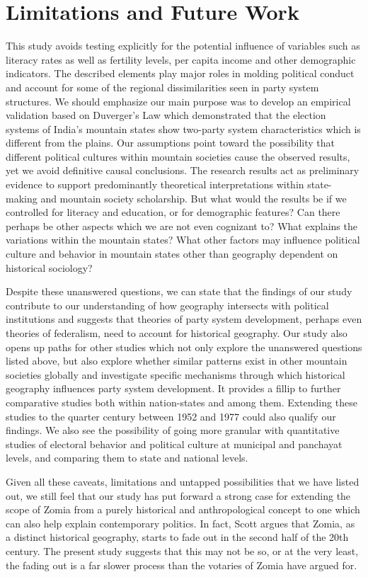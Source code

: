 \section{Limitations and Future Work}
This study avoids testing explicitly for the potential influence of variables such as literacy rates as well as fertility levels, per capita income and other demographic indicators. The described elements play major roles in molding political conduct and account for some of the regional dissimilarities seen in party system structures. We should emphasize our main purpose was to develop an empirical validation based on Duverger's Law which demonstrated that the election systems of India's mountain states show two-party system characteristics which is different from the plains. Our assumptions point toward the possibility that different political cultures within mountain societies cause the observed results, yet we avoid definitive causal conclusions. The research results act as preliminary evidence to support predominantly theoretical interpretations within state-making and mountain society scholarship. But what would the results be if we controlled for literacy and education, or for demographic features? Can there perhaps be other aspects which we are not even cognizant to?  What explains the variations within the mountain states? What other factors may influence political culture and behavior in mountain states other than geography dependent on historical sociology?  

Despite these unanswered questions, we can state that the findings of our study contribute to our understanding of how geography intersects with political institutions and suggests that theories of party system development, perhaps even theories of federalism, need to account for historical geography. Our study also opens up paths for other studies which not only explore the unanswered questions listed above, but also explore whether similar patterns exist in other mountain societies globally and investigate specific mechanisms through which historical geography influences party system development. It provides a fillip to further comparative studies both within nation-states and among them. Extending these studies to the quarter century between 1952 and 1977  could also qualify our findings. We also see the possibility of going more granular with quantitative studies of electoral behavior and political culture at municipal and panchayat levels, and comparing them to state and national levels. 

Given all these caveats, limitations and untapped possibilities that we have listed out, we still feel that our study has put forward a strong case for extending the scope of Zomia from a purely historical and anthropological concept to one which can also help explain contemporary politics. In fact, Scott argues that Zomia, as a distinct historical geography, starts to fade out in the second half of the 20th century. The present study suggests that this may not be so, or at the very least, the fading out is a far slower process than the votaries of Zomia have argued for.  

